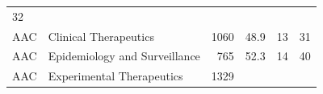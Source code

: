 \documentclass[11pt,]{article}
\begin{document}
\begin{longtable}[]{@{}llrrrr@{}}
\begin{minipage}[t]{0.11\columnwidth}
32\strut
\end{minipage}\tabularnewline
\begin{minipage}[t]{0.06\columnwidth}\raggedright\strut
AAC\strut
\end{minipage} & \begin{minipage}[t]{0.43\columnwidth}\raggedright\strut
Clinical Therapeutics\strut
\end{minipage} & \begin{minipage}[t]{0.04\columnwidth}\raggedleft\strut
1060\strut
\end{minipage} & \begin{minipage}[t]{0.08\columnwidth}\raggedleft\strut
48.9\strut
\end{minipage} & \begin{minipage}[t]{0.11\columnwidth}\raggedleft\strut
13\strut
\end{minipage} & \begin{minipage}[t]{0.11\columnwidth}\raggedleft\strut
31\strut
\end{minipage}\tabularnewline
\begin{minipage}[t]{0.06\columnwidth}\raggedright\strut
AAC\strut
\end{minipage} & \begin{minipage}[t]{0.43\columnwidth}\raggedright\strut
Epidemiology and Surveillance\strut
\end{minipage} & \begin{minipage}[t]{0.04\columnwidth}\raggedleft\strut
765\strut
\end{minipage} & \begin{minipage}[t]{0.08\columnwidth}\raggedleft\strut
52.3\strut
\end{minipage} & \begin{minipage}[t]{0.11\columnwidth}\raggedleft\strut
14\strut
\end{minipage} & \begin{minipage}[t]{0.11\columnwidth}\raggedleft\strut
40\strut
\end{minipage}\tabularnewline
\begin{minipage}[t]{0.06\columnwidth}\raggedright\strut
AAC\strut
\end{minipage} & \begin{minipage}[t]{0.43\columnwidth}\raggedright\strut
Experimental Therapeutics\strut
\end{minipage} & \begin{minipage}[t]{0.04\columnwidth}\raggedleft\strut
1329\strut
\end{minipage} & \begin{minipage}[t]{0.08\columnwidth}\raggedleft\strut

\end{minipage}
\end{longtable}
\end{document}
